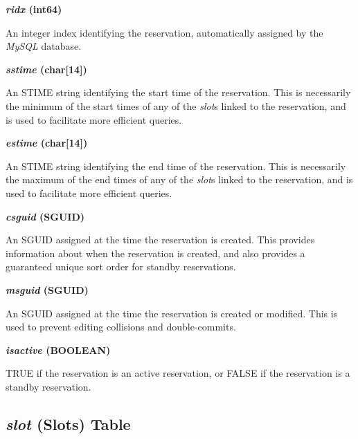 \documentclass[letterpaper,10pt,titlepage]{article}
\newenvironment{docdbtblfielddef}{\begin{list}
               {}{\setlength{\labelwidth}{0mm}
                  \setlength{\leftmargin}{10mm}
                  \setlength{\itemindent}{-5mm}
                  \setlength{\parsep}{0.85mm}}}
               {\end{list}}
\begin{document}
\begin{docdbtblfielddef}
\item {}\textbf{\emph{ridx} (int64)}

An integer index identifying the reservation, automatically
assigned by the \emph{MySQL} database.

\item {}\textbf{\emph{sstime} (char[14])}

An STIME string identifying the start time of the reservation.  This is 
necessarily the minimum of the start times of any of the \emph{slot}s linked
to the reservation, and is used to facilitate more efficient queries.

\item {}\textbf{\emph{estime} (char[14])}

An STIME string identifying the end time of the reservation.  This is 
necessarily the maximum of the end times of any of the \emph{slot}s linked
to the reservation, and is used to facilitate more efficient queries.

\item {}\textbf{\emph{csguid} (SGUID)}

An SGUID assigned at the time the reservation is created.  This provides
information about when the reservation is created, and also provides a
guaranteed unique sort order for standby reservations.

\item {}\textbf{\emph{msguid} (SGUID)}

An SGUID assigned at the time the reservation is created or modified.
This is used to prevent editing collisions and double-commits.

\item {}\textbf{\emph{isactive} (BOOLEAN)}

TRUE if the reservation is an
active reservation,
or FALSE if the reservation is a standby reservation. 
\end{docdbtblfielddef}

\subsection{\emph{slot} (Slots) Table}
\label{sdtf0:sslt0}
\end{document}
